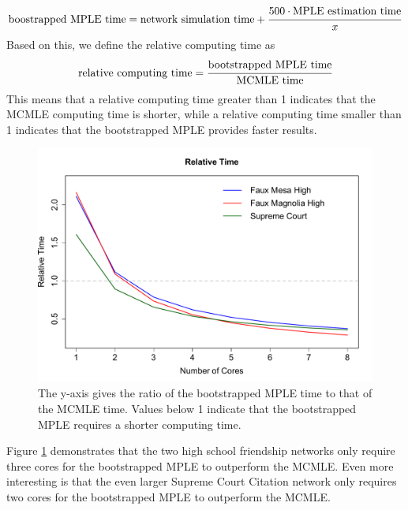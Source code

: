 \documentclass[headsepline=true, abstracton]{scrartcl}
\begin{document}
$$\text{boostrapped MPLE time} = \text{network simulation time} + \cfrac{500 \cdot \text{MPLE estimation time}}{x}$$     
Based on this, we define the relative computing time as
$$\text{relative computing time}= \cfrac{\text{bootstrapped MPLE time}}{\text{MCMLE time}}$$
This means that a relative computing time greater than 1 indicates that the MCMLE computing time is shorter, while a relative computing time smaller than 1 indicates that the bootstrapped MPLE provides faster results. 
\begin{figure}
\begin{center}
\includegraphics[scale=.45]{rel_time}
\caption{The y-axis gives the ratio of the bootstrapped MPLE time to that of the MCMLE time. Values below 1 indicate that the bootstrapped MPLE requires a shorter computing time.}
\label{comptime}
\end{center}
\end{figure}
Figure \ref{comptime} demonstrates that the two high school friendship networks only require three cores for the bootstrapped MPLE to outperform the MCMLE. Even more interesting is that the even larger Supreme Court Citation network only requires two cores for the bootstrapped MPLE to outperform the MCMLE.\\[0.3cm]
\end{document}
